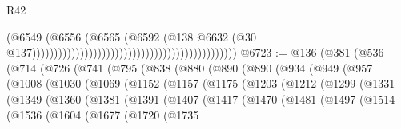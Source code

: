 \begin{lexlean}{R42}
\begin{coremodule}
{                                                                                      (@6549
                                                                                        (@6556
                                                                                          (@6565
                                                                                            (@6592
                                                                                              (@138
                                                                                                @6632
                                                                                                (@30
                                                                                                  @137)))))))))))))))))))))))))))))))))))))))))))))))
@6723 := @136
    (@381
      (@536
        (@714
          (@726
            (@741
              (@795
                (@838
                  (@880
                    (@890
                      (@890
                        (@934
                          (@949
                            (@957
                              (@1008
                                (@1030
                                  (@1069
                                    (@1152
                                      (@1157
                                        (@1175
                                          (@1203
                                            (@1212
                                              (@1299
                                                (@1331
                                                  (@1349
                                                    (@1360
                                                      (@1381
                                                        (@1391
                                                          (@1407
                                                            (@1417
                                                              (@1470
                                                                (@1481
                                                                  (@1497
                                                                    (@1514
                                                                      (@1536
                                                                        (@1604
                                                                          (@1677
                                                                            (@1720
                                                                              (@1735
}
\end{coremodule}
\end{lexlean}
